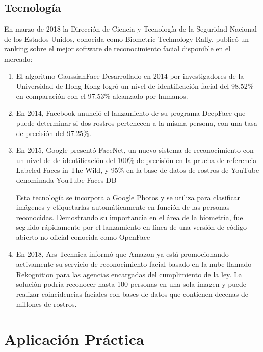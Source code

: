 \documentclass[a4paper,11pt]{book}
\begin{document}
\section{Tecnología}
En marzo de 2018 la Dirección de Ciencia y Tecnología de la Seguridad Nacional de los Estados Unidos, conocida como Biometric Technology Rally\cite{rally}, publicó un ranking sobre el  mejor software de reconocimiento facial disponible en el mercado:

\begin{enumerate}
\item El algoritmo GaussianFace\cite{gaussianface}
	Desarrollado en 2014 por investigadores de la Universidad de Hong Kong logró un nivel de identificación facial del 98.52\% en comparación con el 97.53\% alcanzado por humanos.
	
\item En 2014, Facebook anunció el lanzamiento de su programa DeepFace\cite{deepface} que puede determinar si dos rostros pertenecen a la misma persona, con una tasa de precisión del 97.25\%.

\item En 2015, Google presentó  FaceNet\cite{facenet}, un nuevo sistema de reconocimiento con un nivel de de identificación del 100\% de precisión en la prueba de referencia Labeled Faces in The Wild, y 95\% en la base de datos de rostros de YouTube denominada YouTube Faces DB\cite{youtube}

Esta tecnología se incorpora a Google Photos y se utiliza para clasificar imágenes y etiquetarlas automáticamente en
 función de las personas reconocidas. Demostrando su importancia en el área de la biometría, fue seguido rápidamente por el lanzamiento en línea de una versión de código abierto no oficial conocida como OpenFace
 
 \item En 2018, Ars Technica\cite{ars} informó que Amazon ya está promocionando activamente su servicio de reconocimiento facial basado en la nube llamado Rekognition\cite{aws} para las agencias encargadas del cumplimiento de la ley. La solución podría reconocer hasta 100 personas en una sola imagen y puede realizar coincidencias faciales con bases de datos que contienen decenas de millones de rostros. 
 
\end{enumerate}

\chapter{Aplicación Práctica}
\end{document}
